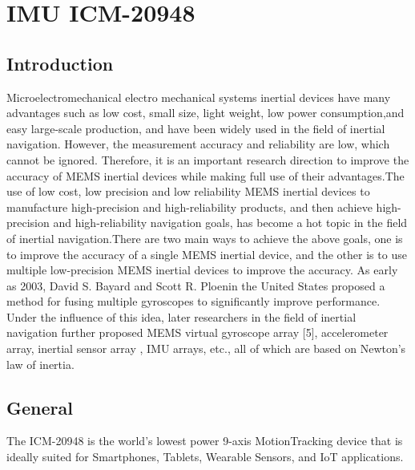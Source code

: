 %
%



\chapter{IMU ICM-20948}

\section{Introduction}

Microelectromechanical electro mechanical systems  inertial devices have many advantages such as low cost, small size, light weight, low power consumption,and easy large-scale production, and have been widely used in the field of inertial navigation. However, the measurement accuracy and reliability are low, which cannot be ignored. Therefore, it is an important research direction to improve the accuracy of MEMS inertial devices while making full use of their advantages.The use of low cost, low precision and low reliability MEMS inertial devices to manufacture high-precision and high-reliability products, and then achieve high-precision and high-reliability navigation goals, has become a hot topic in the field of inertial navigation.There are two main ways to achieve the above goals, one is to improve the accuracy of a single MEMS inertial device, and the other is to use multiple low-precision MEMS inertial devices to improve the accuracy. As early as 2003, David S. Bayard and Scott R. Ploenin the United States proposed a method for fusing multiple gyroscopes to significantly improve performance.\cite{Treichler:2005} Under the influence of this idea, later researchers in the field of inertial navigation further proposed MEMS virtual gyroscope array [5], accelerometer array, inertial sensor array \cite{Zhu:2014}, IMU arrays, etc., all of which are based on Newton’s law of inertia.\cite{Xuan:2024}

\section{General}

The ICM-20948 is the world’s lowest power 9-axis MotionTracking device that is ideally suited for Smartphones, Tablets, Wearable Sensors, and IoT applications.\cite{TDK:2024}

